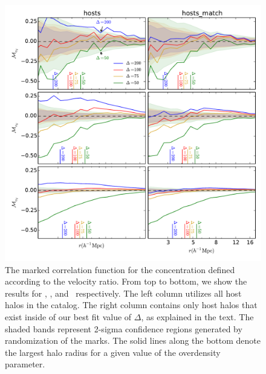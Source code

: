 \documentclass[usenatbib,usegraphicx,letterpaper]{mn2e}
\begin{document}
\begin{figure}
	\centering
	\includegraphics[width=\textwidth]{all_mcf_cV_z00_hostsvmatch.pdf}
	\caption{The marked correlation function for the concentration defined according to the velocity ratio. From top to bottom, we show the results for \simA, \simB, and \simC \ respectively. The left column utilizes all host halos in the catalog. The right column contains only host halos that exist inside of our best fit value of $\Delta$, as explained in the text. The shaded bands represent 2-sigma confidence regions generated by randomization of the marks. The solid lines along the bottom denote the largest halo radius for a given value of the overdensity parameter. }
	\label{fig:hvm_mcf_cV}
\end{figure}
\end{document}

